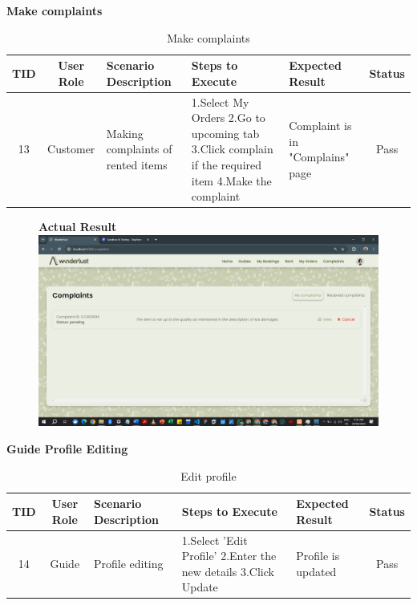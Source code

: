 \textbf{Make complaints}\\
\begin{table}[ht]
\centering
\begin{tabularx}{\textwidth}{|c|c|X|X|X|c|}
\hline
\textbf{TID} & \textbf{User Role} & \textbf{Scenario Description} & \textbf{Steps to Execute} & \textbf{Expected Result} & \textbf{Status} \\ \hline
13 & Customer & Making complaints of rented items & 1.Select My Orders \newline2.Go to upcoming tab \newline3.Click complain if the required item \newline4.Make the complaint & Complaint is in "Complains" page & Pass \\ \hline
\end{tabularx}
\caption{Make complaints}
\end{table}

\begin{figure}[h!]
    \centering
    \textbf{Actual Result}
    \includegraphics[width=1\textwidth]{Images/Test Cases/13. make complaints.png}
\end{figure}
\clearpage


\textbf{Guide Profile Editing}\\
\begin{table}[ht]
\centering
\begin{tabularx}{\textwidth}{|c|c|X|X|X|c|}
\hline
\textbf{TID} & \textbf{User Role} & \textbf{Scenario Description} & \textbf{Steps to Execute} & \textbf{Expected Result} & \textbf{Status} \\ \hline
14 & Guide & Profile editing & 1.Select 'Edit Profile' \newline2.Enter the new details \newline3.Click Update & Profile is updated & Pass \\ \hline
\end{tabularx}
\caption{Edit profile}
\end{table}

